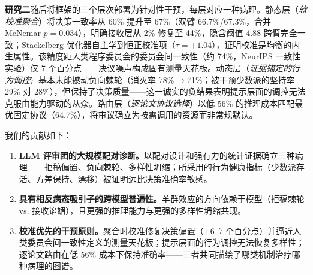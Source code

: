 \textbf{研究二}随后将框架的三个层次部署为针对性干预，每层对应一种病理。静态层（\emph{软校准聚合}）将决策一致率从 60\% 提升至 67\%（双臂 66.7\%/67.3\%，合并 McNemar $p{=}0.034$），明确接收层从 2\% 修复至 44\%，隐含阈值 4.88 跨臂完全一致；Stackelberg 优化器自主学到恒正校准项（$\tau{=}+1.04$），证明校准是均衡的内生属性。该精度距人类程序委员会的委员会间一致性（约 74\%，NeurIPS 一致性实验）仅 7 个百分点——决议噪声构成固有测量天花板。动态层（\emph{证据锚定的行为调控}）基本未能撼动负向棘轮（消灭率 78\%$\to$71\%；被干预少数派的坚持率 29\% 对 28\%），但保持了决策质量——这一诚实的负结果表明提示层面的调控无法克服由能力驱动的从众。路由层（\emph{逐论文协议选择}）以低 56\% 的推理成本匹配最优固定协议（64.7\%），将审议确立为按需调用的资源而非常规默认。

我们的贡献如下：
\begin{enumerate}
    \item \textbf{LLM 评审团的大规模配对诊断。}以配对设计和强有力的统计证据确立三种病理——拒稿偏置、负向棘轮、多样性坍缩；所采用的行为健康指标（少数派存活、方差保持、漂移）被证明远比决策准确率敏感。
    \item \textbf{具有相反病态吸引子的跨模型普遍性。}羊群效应的方向依赖于模型（拒稿棘轮 vs. 接收谄媚），且更强的推理能力与更强的多样性坍缩共现。
    \item \textbf{校准优先的干预原则。}聚合时校准修复决策偏置（+6~7 个百分点）并逼近人类委员会间一致性定义的测量天花板；提示层面的行为调控无法恢复多样性；逐论文路由在低 56\% 成本下保持准确率——三者共同描绘了哪类机制治疗哪种病理的图谱。
\end{enumerate}
